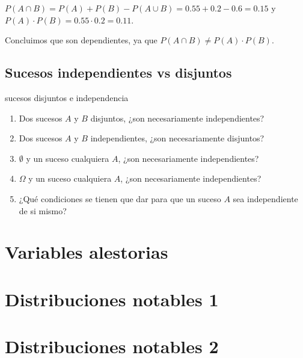 \documentclass[
  letterpaper,
  DIV=11,
  numbers=noendperiod]{scrreprt}
\providecommand{\tightlist}{%
  \setlength{\itemsep}{0pt}\setlength{\parskip}{0pt}}\usepackage{longtable,booktabs,array}
\begin{document}
\(P(A\cap B)=P(A)+P(B)-P(A\cup B)=0.55+0.2-0.6=0.15\) y
\(P(A)\cdot P(B) = 0.55\cdot 0.2=0.11.\)

Concluimos que son dependientes, ya que
\(P(A\cap B)\neq P(A)\cdot P(B)\).

\section{Sucesos independientes vs
disjuntos}\label{sucesos-independientes-vs-disjuntos}

sucesos disjuntos e independencia

\begin{enumerate}
\def\labelenumi{\arabic{enumi}.}
\tightlist
\item
  Dos sucesos \(A\) y \(B\) disjuntos, ¿son necesariamente
  independientes?
\item
  Dos sucesos \(A\) y \(B\) independientes, ¿son necesariamente
  disjuntos?
\item
  \(\emptyset\) y un suceso cualquiera \(A\), ¿son necesariamente
  independientes?
\item
  \(\Omega\) y un suceso cualquiera \(A\), ¿son necesariamente
  independientes?
\item
  ¿Qué condiciones se tienen que dar para que un suceso \(A\) sea
  independiente de si mismo?
\end{enumerate}

\chapter{Variables alestorias}\label{variables-alestorias}

\chapter{Distribuciones notables 1}\label{distribuciones-notables-1}

\chapter{Distribuciones notables 2}\label{distribuciones-notables-2}
\end{document}
